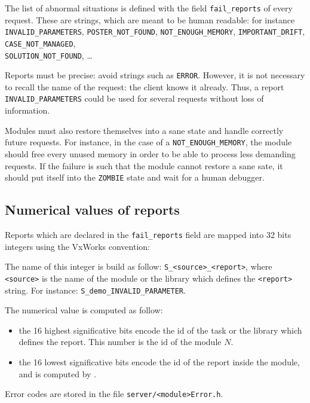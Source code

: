The list of abnormal situations is defined with the field \texttt{fail\_reports}
of every   request.  These   are strings,   which are   meant to be  human
readable:       for      instance  \texttt{INVALID\_PARAMETERS},   
\texttt{POSTER\_NOT\_FOUND}, \texttt{NOT\_ENOUGH\_MEMORY},   \texttt{IMPORTANT\_DRIFT},
\texttt{CASE\_NOT\_MANAGED},\\ \texttt{SOLUTION\_NOT\_FOUND}, \ldots

Reports must be precise:  avoid strings such  as \texttt{ERROR}. However, it
is not necessary to recall the name  of the request:  the client knows it
already.  Thus, a  report \texttt{INVALID\_PARAMETERS}   could be used  for
several requests without loss of information.

Modules must  also   restore  themselves into  a  sane  state  and handle
correctly future   requests.   For  instance, in  the   case  of  a  
\texttt{NOT\_ENOUGH\_MEMORY}, the module should free every unused memory in order
to be able to process  less demanding requests.  If  the failure is  such
that the module cannot restore a sane sate, it should put itself into the
\texttt{ZOMBIE} state and wait for a human debugger.


\subsection{Numerical values of reports}

Reports which  are declared in the \texttt{fail\_reports} field are mapped into
32 bits integers using the VxWorks convention:

The name of this integer is build as follow: \texttt{S\_<source>\_<report>},
where \texttt{<source>} is the name of the module or the library which defines
the      \texttt{<report>}     string.    For       instance:     
\texttt{S\_demo\_INVALID\_PARAMETER}.

The numerical value is computed as follow:
\begin{itemize}
\item the 16 highest significative bits encode the id of the task or
the  library which  defines the report.   This  number is  the  id of the
module  $N$.

\item the 16 lowest significative bits encode the id of the report
inside the module, and is computed by \GenoM.
\end{itemize}

Error codes are stored in the file \texttt{server/<module>Error.h}.



